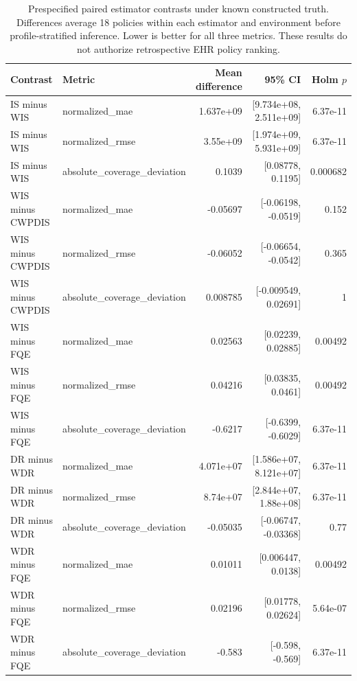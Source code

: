 \begin{table}[t]
\centering
\caption{Prespecified paired estimator contrasts under known constructed truth. Differences average 18 policies within each estimator and environment before profile-stratified inference. Lower is better for all three metrics. These results do not authorize retrospective EHR policy ranking.}
\label{tab:kdd213-estimator-contrasts}
\scriptsize
\begin{tabular}{llrrr}
\toprule
Contrast & Metric & Mean difference & 95\% CI & Holm $p$ \\
\midrule
IS minus WIS & normalized\_mae & 1.637e+09 & [9.734e+08, 2.511e+09] & 6.37e-11 \\
IS minus WIS & normalized\_rmse & 3.55e+09 & [1.974e+09, 5.931e+09] & 6.37e-11 \\
IS minus WIS & absolute\_coverage\_deviation & 0.1039 & [0.08778, 0.1195] & 0.000682 \\
WIS minus CWPDIS & normalized\_mae & -0.05697 & [-0.06198, -0.0519] & 0.152 \\
WIS minus CWPDIS & normalized\_rmse & -0.06052 & [-0.06654, -0.0542] & 0.365 \\
WIS minus CWPDIS & absolute\_coverage\_deviation & 0.008785 & [-0.009549, 0.02691] & 1 \\
WIS minus FQE & normalized\_mae & 0.02563 & [0.02239, 0.02885] & 0.00492 \\
WIS minus FQE & normalized\_rmse & 0.04216 & [0.03835, 0.0461] & 0.00492 \\
WIS minus FQE & absolute\_coverage\_deviation & -0.6217 & [-0.6399, -0.6029] & 6.37e-11 \\
DR minus WDR & normalized\_mae & 4.071e+07 & [1.586e+07, 8.121e+07] & 6.37e-11 \\
DR minus WDR & normalized\_rmse & 8.74e+07 & [2.844e+07, 1.88e+08] & 6.37e-11 \\
DR minus WDR & absolute\_coverage\_deviation & -0.05035 & [-0.06747, -0.03368] & 0.77 \\
WDR minus FQE & normalized\_mae & 0.01011 & [0.006447, 0.0138] & 0.00492 \\
WDR minus FQE & normalized\_rmse & 0.02196 & [0.01778, 0.02624] & 5.64e-07 \\
WDR minus FQE & absolute\_coverage\_deviation & -0.583 & [-0.598, -0.569] & 6.37e-11 \\
\bottomrule
\end{tabular}
\end{table}
